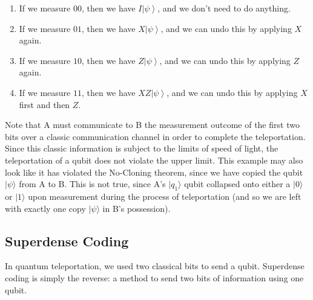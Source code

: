 \documentclass{article}
\newcommand{\ket}[1]{\ensuremath{\left|#1\right\rangle}}
\begin{document}
\begin{theorem}
\begin{enumerate}
          \begin{enumerate} 
            \item If we measure $00$, then we have $I \ket{\psi}$, and we don't need to do anything. 
            \item If we measure $01$, then we have $X \ket{\psi}$, and we can undo this by applying $X$ again. 
            \item If we measure $10$, then we have $Z \ket{\psi}$, and we can undo this by applying $Z$ again.
            \item If we measure $11$, then we have $X Z \ket{\psi}$, and we can undo this by applying $X$ first and then $Z$. 
          \end{enumerate}
      \end{enumerate}
    \end{theorem}

    Note that A must communicate to B the measurement outcome of the first two bits over a classic communication channel in order to complete the teleportation. Since this classic information is subject to the limits of speed of light, the teleportation of a qubit does not violate the upper limit. This example may also look like it has violated the No-Cloning theorem, since we have copied the qubit $|\psi\rangle$ from A to B. This is not true, since A's $|q_1\rangle$ qubit collapsed onto either a $|0\rangle$ or $|1\rangle$ upon measurement during the process of teleportation (and so we are left with exactly one copy $|\psi\rangle$ in B's possession).

  \subsection{Superdense Coding} 

    In quantum teleportation, we used two classical bits to send a qubit. Superdense coding is simply the reverse: a method to send two bits of information using one qubit.  
\end{document}
